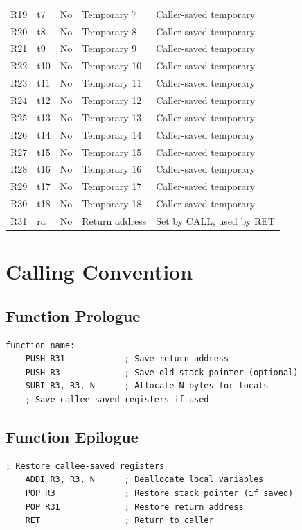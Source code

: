 \documentclass[12pt,a4paper,oneside]{book}
\begin{document}
\begin{table}[H]
\begin{tabularx}{\textwidth}{|l|l|l|l|X|}
R19 & t7 & No & Temporary 7 & Caller-saved temporary \\
R20 & t8 & No & Temporary 8 & Caller-saved temporary \\
R21 & t9 & No & Temporary 9 & Caller-saved temporary \\
R22 & t10 & No & Temporary 10 & Caller-saved temporary \\
R23 & t11 & No & Temporary 11 & Caller-saved temporary \\
R24 & t12 & No & Temporary 12 & Caller-saved temporary \\
R25 & t13 & No & Temporary 13 & Caller-saved temporary \\
R26 & t14 & No & Temporary 14 & Caller-saved temporary \\
R27 & t15 & No & Temporary 15 & Caller-saved temporary \\
R28 & t16 & No & Temporary 16 & Caller-saved temporary \\
R29 & t17 & No & Temporary 17 & Caller-saved temporary \\
R30 & t18 & No & Temporary 18 & Caller-saved temporary \\
R31 & ra & No & Return address & Set by CALL, used by RET \\
\hline
\end{tabularx}
\end{table}

\section{Calling Convention}

\subsection{Function Prologue}

\begin{lstlisting}[style=assembly, caption={Standard Function Prologue}]
function_name:
    PUSH R31            ; Save return address
    PUSH R3             ; Save old stack pointer (optional)
    SUBI R3, R3, N      ; Allocate N bytes for locals
    ; Save callee-saved registers if used
\end{lstlisting}

\subsection{Function Epilogue}

\begin{lstlisting}[style=assembly, caption={Standard Function Epilogue}]
    ; Restore callee-saved registers
    ADDI R3, R3, N      ; Deallocate local variables
    POP R3              ; Restore stack pointer (if saved)
    POP R31             ; Restore return address
    RET                 ; Return to caller
\end{lstlisting}
\end{document}
